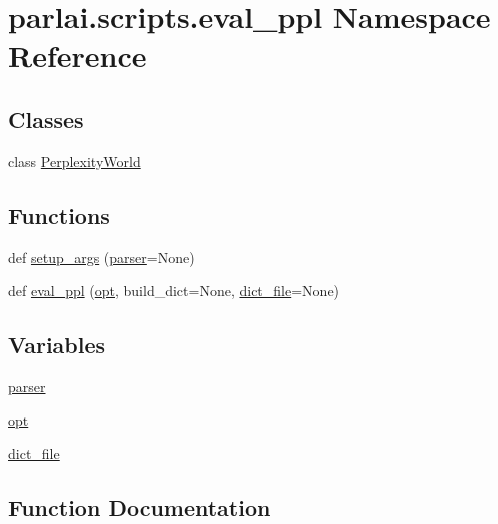 \hypertarget{namespaceparlai_1_1scripts_1_1eval__ppl}{}\section{parlai.\+scripts.\+eval\+\_\+ppl Namespace Reference}
\label{namespaceparlai_1_1scripts_1_1eval__ppl}
\subsection*{Classes}
\begin{DoxyCompactItemize}
\item 
class \hyperlink{classparlai_1_1scripts_1_1eval__ppl_1_1PerplexityWorld}{Perplexity\+World}
\end{DoxyCompactItemize}
\subsection*{Functions}
\begin{DoxyCompactItemize}
\item 
def \hyperlink{namespaceparlai_1_1scripts_1_1eval__ppl_a4ae22cc04e19c46ed621afeba6e85d67}{setup\+\_\+args} (\hyperlink{namespaceparlai_1_1scripts_1_1eval__ppl_a83ff19dbdfc8e059be5126ecfb0804ae}{parser}=None)
\item 
def \hyperlink{namespaceparlai_1_1scripts_1_1eval__ppl_ad1a8a8891f276136e82edc906ea58340}{eval\+\_\+ppl} (\hyperlink{namespaceparlai_1_1scripts_1_1eval__ppl_a0e79f76660ddfdf2c00a552f50edaec6}{opt}, build\+\_\+dict=None, \hyperlink{namespaceparlai_1_1scripts_1_1eval__ppl_a9f9177d01476851d8e9923f2c624fd4e}{dict\+\_\+file}=None)
\end{DoxyCompactItemize}
\subsection*{Variables}
\begin{DoxyCompactItemize}
\item 
\hyperlink{namespaceparlai_1_1scripts_1_1eval__ppl_a83ff19dbdfc8e059be5126ecfb0804ae}{parser}
\item 
\hyperlink{namespaceparlai_1_1scripts_1_1eval__ppl_a0e79f76660ddfdf2c00a552f50edaec6}{opt}
\item 
\hyperlink{namespaceparlai_1_1scripts_1_1eval__ppl_a9f9177d01476851d8e9923f2c624fd4e}{dict\+\_\+file}
\end{DoxyCompactItemize}


\subsection{Function Documentation}
\mbox{\label{namespaceparlai_1_1scripts_1_1eval__ppl_ad1a8a8891f276136e82edc906ea58340}} 
